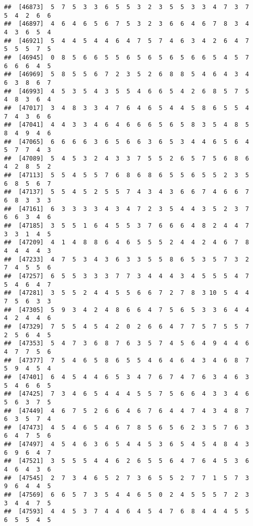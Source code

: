 \documentclass[
]{book}
\begin{document}
\begin{verbatim}
##  [46873]  5  7  5  3  3  6  5  5  3  2  3  5  5  3  3  4  7  3  7  5  4  2  6  6
##  [46897]  4  6  4  6  5  6  7  5  3  2  3  6  6  4  6  7  8  3  4  4  3  6  5  4
##  [46921]  5  4  4  5  4  4  6  4  7  5  7  4  6  3  4  2  6  4  7  5  5  5  7  5
##  [46945]  0  8  5  6  6  5  5  6  5  6  5  6  5  6  6  5  4  5  7  6  6  6  4  5
##  [46969]  5  8  5  5  6  7  2  3  5  2  6  8  8  5  4  6  4  3  4  6  3  8  6  7
##  [46993]  4  5  3  5  4  3  5  5  4  6  6  5  4  2  6  8  5  7  5  4  8  3  6  4
##  [47017]  3  4  8  3  3  4  7  6  4  6  5  4  4  5  8  6  5  5  4  7  4  3  6  6
##  [47041]  4  4  3  3  4  6  4  6  6  6  5  6  5  8  3  5  4  8  5  8  4  9  4  6
##  [47065]  6  6  6  6  3  6  5  6  6  3  6  5  3  4  4  6  5  6  4  5  7  7  4  3
##  [47089]  5  4  5  3  2  4  3  3  7  5  5  2  6  5  7  5  6  8  6  4  2  8  5  2
##  [47113]  5  5  4  5  5  7  6  8  6  8  6  5  5  6  5  5  2  3  5  6  8  5  6  7
##  [47137]  5  5  4  5  2  5  5  7  4  3  4  3  6  6  7  4  6  6  7  6  8  3  3  3
##  [47161]  6  3  3  3  3  4  3  4  7  2  3  5  4  4  3  5  2  3  7  6  6  3  4  6
##  [47185]  3  5  5  1  6  4  5  5  3  7  6  6  6  4  8  2  4  4  7  3  3  1  4  5
##  [47209]  4  1  4  8  8  6  4  6  5  5  5  2  4  4  2  4  6  7  8  4  4  4  4  3
##  [47233]  4  7  5  3  4  3  6  3  3  5  5  8  6  5  3  5  7  3  2  7  4  5  5  6
##  [47257]  6  5  5  3  3  3  7  7  3  4  4  4  3  4  5  5  5  4  7  5  4  6  4  7
##  [47281]  3  5  5  2  4  4  5  5  6  6  7  2  7  8  3 10  5  4  4  7  5  6  3  3
##  [47305]  5  9  3  4  2  4  8  6  6  4  7  5  6  5  3  3  6  4  4  4  2  4  4  6
##  [47329]  7  5  5  4  5  4  2  0  2  6  6  4  7  7  5  7  5  5  7  2  5  6  4  5
##  [47353]  5  4  7  3  6  8  7  6  3  5  7  4  5  6  4  9  4  4  6  4  7  7  5  6
##  [47377]  7  5  4  6  5  8  6  5  5  4  6  4  6  4  3  4  6  8  7  5  9  4  5  4
##  [47401]  6  4  5  4  4  6  5  3  4  7  6  7  4  7  6  3  4  6  3  5  4  6  6  5
##  [47425]  7  3  4  6  5  4  4  4  5  5  7  5  6  6  4  3  3  4  6  5  6  3  7  5
##  [47449]  4  6  7  5  2  6  6  4  6  7  6  4  4  7  4  3  4  8  7  6  3  5  7  4
##  [47473]  4  5  4  6  5  4  6  7  8  5  6  5  6  2  3  5  7  6  3  6  4  7  5  6
##  [47497]  4  5  4  6  3  6  5  4  4  5  3  6  5  4  5  4  8  4  3  6  9  6  4  7
##  [47521]  3  5  5  5  4  4  6  2  6  5  5  6  4  7  6  4  5  3  6  4  6  4  3  6
##  [47545]  2  7  3  4  6  5  2  7  3  6  5  5  2  7  7  1  5  7  3  9  6  4  4  5
##  [47569]  6  6  5  7  3  5  4  4  6  5  0  2  4  5  5  5  7  2  3  3  4  4  7  5
##  [47593]  4  4  5  3  7  4  4  6  4  5  4  7  6  8  4  4  4  5  5  6  5  5  4  5

\end{verbatim}
\end{document}
